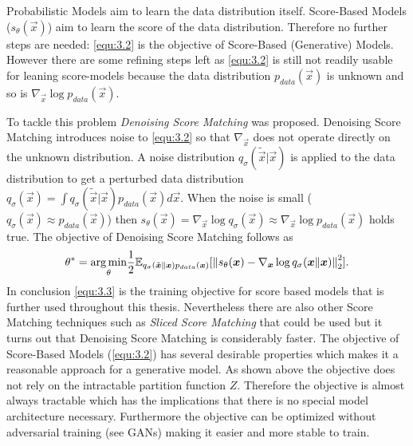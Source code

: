 Probabilistic Models aim to learn the data distribution itself. Score-Based Models ($s_\theta(\vec{x})$) aim to learn the score of the data distribution. Therefore no further steps are needed: \cref{equ:3.2} is the objective of Score-Based (Generative) Models. However there are some refining steps left as \cref{equ:3.2} is still not readily usable for leaning score-models because the data distribution $p_{data}(\vec{x})$ is unknown and so is $\nabla_{\vec{x}}\log p_{data}(\vec{x})$. 

%
%
To tackle this problem \textit{Denoising Score Matching} \cite{denoise_score} was proposed. Denoising Score Matching introduces noise to \cref{equ:3.2} so that $\nabla_{\vec{x}}$ does not operate directly on the unknown distribution. A noise distribution $q_\sigma(\tilde{\vec{x}}|\vec{x})$ is applied to the data distribution to get a perturbed data distribution $q_\sigma(\vec{x})=\int q_\sigma(\tilde{\vec{x}}|\vec{x})p_{data}(\vec{x})d\vec{x}$. When the noise is small ($q_\sigma(\vec{x})\approx p_{data}(\vec{x})$) then $s_\theta(\vec{x})=\nabla_{\vec{x}}\log q_\sigma(\vec{x})\approx\nabla_{\vec{x}}\log p_{data}(\vec{x})$ holds true. The objective of Denoising Score Matching follows as
%
\begin{equation} \label{equ:3.3}
    \theta^*=\underset{\theta}{\arg\min}\frac{1}{2}\mathbb{E}_{q_\sigma(\tilde{\boldsymbol{x}}\lVert\boldsymbol{x})p_{data}(\boldsymbol{x})}[\left\lVert s_\theta(\boldsymbol{x})-\nabla_{\boldsymbol{x}}\log q_\sigma(\boldsymbol{x}\lVert\boldsymbol{x})\right\rVert^2_2].
\end{equation}
%
In conclusion \cref{equ:3.3} is the training objective for score based models that is further used throughout this thesis. Nevertheless there are also other Score Matching techniques such as \textit{Sliced Score Matching} \cite{song2019sliced} that could be used but it turns out that Denoising Score Matching is considerably faster. The objective of Score-Based Models (\cref{equ:3.2}) has several desirable properties which makes it a reasonable approach for a generative model. As shown above the objective does not rely on the intractable partition function $Z$. Therefore the objective is almost always tractable which has the implications that there is no special model architecture necessary. Furthermore the objective can be optimized without adversarial training (see GANs) making it easier and more stable to train. %

